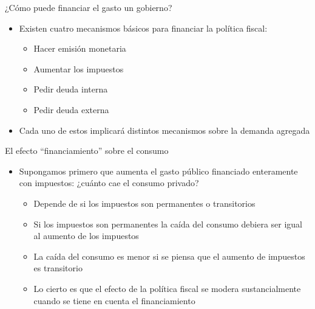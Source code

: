 \documentclass{beamer}
\begin{document}
\begin{frame}{¿Cómo puede financiar el gasto un gobierno?}
    \begin{itemize}
        \item Existen cuatro mecanismos básicos para financiar la política fiscal:
        \begin{itemize}
            \item Hacer emisión monetaria 
            \item Aumentar los impuestos
            \item Pedir deuda interna
            \item Pedir deuda externa 
        \end{itemize}
        \vspace{2mm}
        \item Cada uno de estos implicará distintos mecanismos sobre la demanda agregada
    \end{itemize}
\end{frame}

\begin{frame}{El efecto “financiamiento” sobre el consumo}
    \begin{itemize}
        \item Supongamos primero que aumenta el gasto público financiado enteramente con impuestos: ¿cuánto cae el consumo privado?
        \begin{itemize}
            \item Depende de si los impuestos son permanentes o transitorios
            \item Si los impuestos son permanentes la caída del consumo debiera ser igual al aumento de los impuestos
            \item La caída del consumo es menor si se piensa que el aumento de impuestos es transitorio
            \item Lo cierto es que el efecto de la política fiscal se modera sustancialmente cuando se tiene en cuenta el financiamiento
        \end{itemize}
    \end{itemize}
\end{frame}
\end{document}
